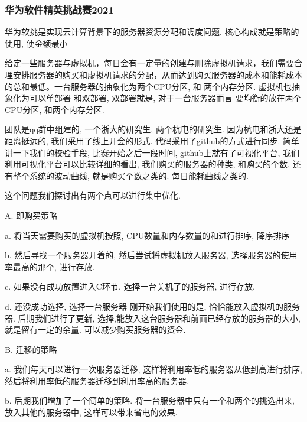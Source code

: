 \subsubsection{华为软件精英挑战赛2021}
华为软挑是实现云计算背景下的服务器资源分配和调度问题.  核心构成就是策略的使用, 使金额最小 \par
给定一些服务器与虚拟机，每日会有一定量的创建与删除虚拟机请求，我们需要合理安排服务器的购买和虚拟机请求的分配，从而达到购买服务器的成本和能耗成本的总和最低。一台服务器的抽象化为两个CPU分区, 和 两个内存分区.  虚拟机也抽象化为可以单部署 和双部署, 双部署就是, 对于一台服务器而言 要均衡的放在两个CPU分区, 和两个内存分区. \par
团队是qq群中组建的, 一个浙大的研究生, 两个杭电的研究生. 因为杭电和浙大还是距离挺远的, 我们采用了线上开会的形式.  代码采用了github的方式进行同步. 简单讲一下我们的校验手段, 比赛开始之后一段时间, github上就有了可视化平台, 我们利用可视化平台可以比较详细的看出, 我们购买的服务器的种类, 和购买的个数.  还有整个系统的波动曲线, 就是购买个数之类的. 每日能耗曲线之类的. \par
这个问题我们探讨出有两个点可以进行集中优化. \par

A. 即购买策略\par
a. 将当天需要购买的虚拟机按照, CPU数量和内存数量的和进行排序, 降序排序\par
b. 然后寻找一个服务器开着的, 然后尝试将虚拟机放入服务器, 选择服务器的使用率最高的那个, 进行存放.\par
c. 如果没有成功放置进入C环节, 选择一台关机了的服务器, 进行存放.\par
d. 还没成功选择, 选择一台服务器 刚开始我们使用的是, 恰恰能放入虚拟机的服务器. 后期我们进行了更新, 选择,能放入这台服务器和前面已经存放的服务器的大小, 就是留有一定的余量. 可以减少购买服务器的资金.\par
B. 迁移的策略\par
a. 我们每天可以进行一次服务器迁移, 这样将利用率低的服务器从低到高进行排序, 然后将利用率低的服务器迁移到利用率高的服务器.\par
b. 后期我们增加了一个简单的策略. 将一台服务器中只有一个和两个的挑选出来, 放入其他的服务器中, 这样可以带来省电的效果.\par

